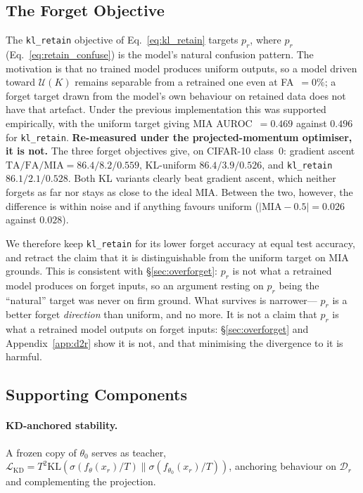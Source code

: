 \documentclass{article}
\newcommand{\klr}{\texttt{kl\_retain}}
\newcommand{\KL}{\mathrm{KL}}
\newcommand{\Dr}{\mathcal{D}_r}
\newcommand{\losskd}{\mathcal{L}_{\mathrm{KD}}}
\theoremstyle{remark}
\theoremstyle{plain}
\begin{document}
\subsection{The Forget Objective}

The \klr{} objective of Eq.~\ref{eq:kl_retain} targets $p_r$,
where $p_r$ (Eq.~\ref{eq:retain_confuse}) is the model's natural confusion
pattern. The motivation is that no trained model produces uniform outputs, so a
model driven toward $\mathcal{U}(K)$ remains separable from a retrained one even
at FA~$=0\%$; a forget target drawn from the model's own behaviour on retained
data does not have that artefact. Under the previous implementation this was
supported empirically, with the uniform target giving MIA AUROC~$=0.469$ against
$0.496$ for \klr{}. \textbf{Re-measured under the projected-momentum optimiser,
it is not.} The three forget objectives give, on CIFAR-10 class~0:
gradient ascent $\mathrm{TA}/\mathrm{FA}/\mathrm{MIA} = 86.4/8.2/0.559$,
KL-uniform $86.4/3.9/0.526$, and \klr{} $86.1/2.1/0.528$. Both KL variants
clearly beat gradient ascent, which neither forgets as far nor stays as close to
the ideal MIA. Between the two, however, the difference is within noise and if
anything favours uniform ($|\mathrm{MIA}-0.5| = 0.026$ against $0.028$).

We therefore keep \klr{} for its lower forget accuracy at equal test accuracy,
and retract the claim that it is distinguishable from the uniform target on
MIA grounds. This is consistent with \S\ref{sec:overforget}: $p_r$ is not what a
retrained model produces on forget inputs, so an argument resting on $p_r$ being
the ``natural'' target was never on firm ground. What survives is narrower---%
$p_r$ is a better forget \emph{direction} than uniform, and no more. It is not a claim that $p_r$ is what a retrained model
outputs on forget inputs: \S\ref{sec:overforget} and
Appendix~\ref{app:d2r} show it is not, and that minimising the divergence to it
is harmful.

\subsection{Supporting Components}

\paragraph{KD-anchored stability.}
A frozen copy of $\theta_0$ serves as teacher,
$\losskd = T^2\KL(\sigma(f_\theta(x_r)/T)\|\sigma(f_{\theta_0}(x_r)/T))$,
anchoring behaviour on $\Dr$ and complementing the projection.
\end{document}
